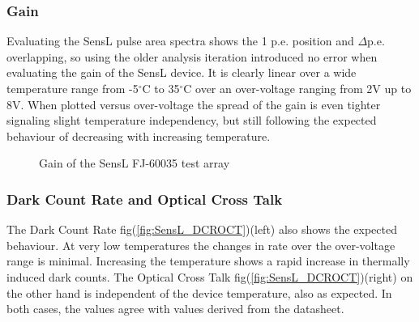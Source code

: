 \documentclass[12pt,article,type=msc,colorback,accentcolor=tud9c]{tudthesis}
\begin{document}
\begin{figure}[h]
\begin{centering}
}
\caption{SensL Test Array and pulse shape at $V_{bias-voltage} = 29V$}
\label{fig:SensL_Array_PS}
\end{centering}
\end{figure}


\subsubsection{Gain}
\label{subsubsec:SensLGain}

Evaluating the SensL pulse area spectra shows the 1 p.e. position and $\Delta$p.e. overlapping, so using the older analysis iteration introduced no error when evaluating the gain of the SensL device. It is clearly linear over a wide temperature range from -5$^\circ$C to 35$^\circ$C over an over-voltage ranging from 2V up to 8V. When plotted versus over-voltage the spread of the gain is even tighter signaling slight temperature independency, but still following the expected behaviour of decreasing with increasing temperature.

\begin{figure}[h!]
\begin{centering}
\caption{Gain of the SensL FJ-60035 test array}
\label{fig:SensL_Gain}
\end{centering}
\end{figure}


\subsubsection{Dark Count Rate and Optical Cross Talk}
\label{subsubsec:SensL_DCROCT}
The Dark Count Rate fig(\ref{fig:SensL_DCROCT})(left) also shows the expected behaviour. At very low temperatures the changes in rate over the over-voltage range is minimal. Increasing the temperature shows a rapid increase in thermally induced dark counts. The Optical Cross Talk fig(\ref{fig:SensL_DCROCT})(right) on the other hand is independent of the device temperature, also as expected. In both cases, the values agree with values derived from the datasheet.
\end{document}
